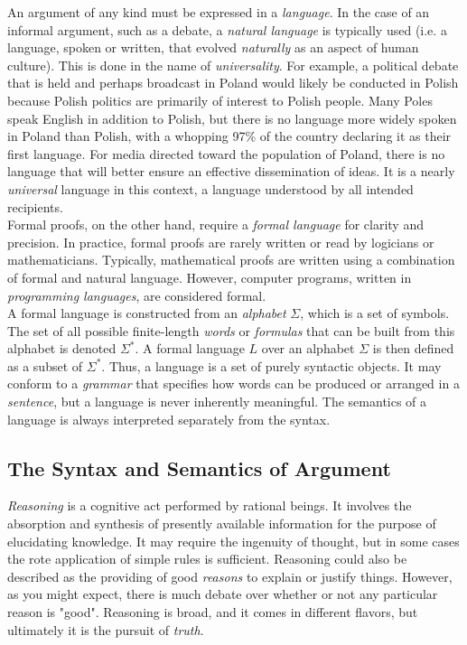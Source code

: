 An argument of any kind must be expressed in a \textit{language}. In the case of an informal argument, such as a debate, a \textit{natural language} is typically used (i.e. a language, spoken or written, that evolved \textit{naturally} as an aspect of human culture). This is done in the name of \textit{universality}. For example, a political debate that is held and perhaps broadcast in Poland would likely be conducted in Polish because Polish politics are primarily of interest to Polish people. Many Poles speak English in addition to Polish, but there is no language more widely spoken in Poland than Polish, with a whopping 97\% of the country declaring it as their first language. For media directed toward the population of Poland, there is no language that will better ensure an effective dissemination of ideas. It is a nearly \textit{universal} language in this context, a language understood by all intended recipients. \\

Formal proofs, on the other hand, require a \textit{formal language} for clarity and precision. In practice, formal proofs are rarely written or read by logicians or mathematicians. Typically, mathematical proofs are written using a combination of formal and natural language. However, computer programs, written in \textit{programming languages}, are considered formal. \\

A formal language is constructed from an \textit{alphabet} $\Sigma$, which is a set of symbols. The set of all possible finite-length \textit{words} or \textit{formulas} that can be built from this alphabet is denoted $\Sigma^*$. A formal language $L$ over an alphabet $\Sigma$ is then defined as a subset of $\Sigma^*$. Thus, a language is a set of purely syntactic objects. It may conform to a \textit{grammar} that specifies how words can be produced or arranged in a \textit{sentence}, but a language is never inherently meaningful. The semantics of a language is always interpreted separately from the syntax. \\


\subsection*{The Syntax and Semantics of Argument}

\textit{Reasoning} is a cognitive act performed by rational beings. It involves the absorption and synthesis of presently available information for the purpose of elucidating knowledge. It may require the ingenuity of thought, but in some cases the rote application of simple rules is sufficient. Reasoning could also be described as the providing of good \textit{reasons} to explain or justify things. However, as you might expect, there is much debate over whether or not any particular reason is "good". Reasoning is broad, and it comes in different flavors, but ultimately it is the pursuit of \textit{truth}. \\

